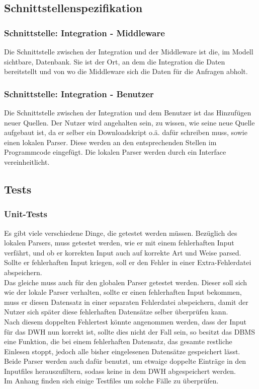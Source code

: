 \subsection{Schnittstellenspezifikation}
\subsubsection{Schnittstelle: Integration - Middleware}
Die Schnittstelle zwischen der Integration und der Middleware ist die, im Modell sichtbare, Datenbank. Sie ist der Ort, an dem die Integration die Daten bereitstellt und von wo die Middleware sich die Daten für die Anfragen abholt.
\subsubsection{Schnittstelle: Integration - Benutzer}
Die Schnittstelle zwischen der Integration und dem Benutzer ist das Hinzufügen neuer Quellen. Der Nutzer wird angehalten sein, zu wissen, wie seine neue Quelle aufgebaut ist, da er selber ein Downloadskript o.ä. dafür schreiben muss, sowie einen lokalen Parser. Diese werden an den entsprechenden Stellen im Programmcode eingefügt. Die lokalen Parser werden durch ein Interface vereinheitlicht.
\subsection{Tests}
\subsubsection{Unit-Tests}
Es gibt viele verschiedene Dinge, die getestet werden müssen. Bezüglich des lokalen Parsers, muss getestet werden, wie er  mit einem fehlerhaften Input verfährt, und ob er korrekten Input auch auf korrekte Art und Weise parsed. Sollte er fehlerhaften Input kriegen, soll er den Fehler in einer Extra-Fehlerdatei abspeichern.\\
Das gleiche muss auch für den globalen Parser getestet werden. Dieser soll sich wie der lokale Parser verhalten, sollte er einen fehlerhaften Input bekommen, muss er diesen Datensatz in einer separaten Fehlerdatei abspeichern, damit der Nutzer sich später diese fehlerhaften Datensätze selber überprüfen kann.\\
Nach diesem doppelten Fehlertest könnte angenommen werden, dass der Input für das DWH nun korrekt ist, sollte dies nicht der Fall sein, so besitzt das DBMS eine Funktion, die bei einem fehlerhaften Datensatz, das gesamte restliche Einlesen stoppt, jedoch alle bisher eingelesenen Datensätze gespeichert lässt.\\
Beide Parser werden auch dafür benutzt, um etwaige doppelte Einträge in den Inputfiles herauszufiltern, sodass keine in dem DWH abgespeichert werden.\\
Im Anhang finden sich einige Testfiles um solche Fälle zu überprüfen.
